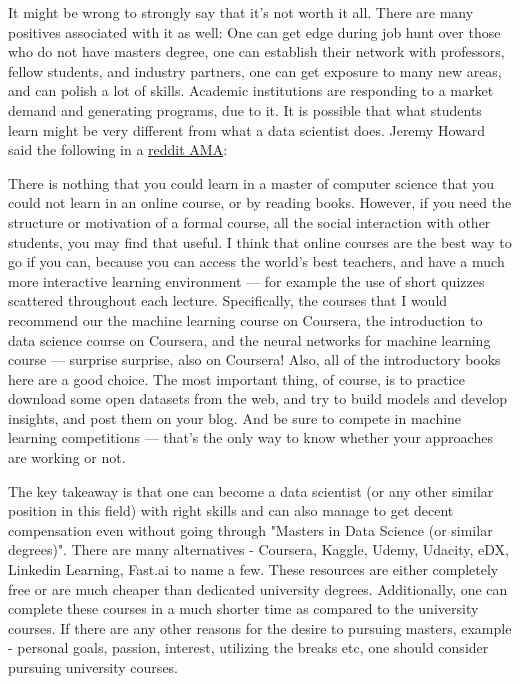 It might be wrong to strongly say that it’s not worth it all. There are many positives associated with it as well: One can get edge during job hunt over those who do not have masters degree, one can establish their network with professors, fellow students, and industry partners, one can get exposure to many new areas, and can polish a lot of skills. Academic institutions are responding to a market demand and generating programs, due to it. It is possible that what students learn might be very different from what a data scientist does.
\newpage
Jeremy Howard said the following in a \href{https://www.reddit.com/r/Futurology/comments/2p6k20/im_jeremy_howard_enlitic_ceo_kaggle_past/cmty7kf/}{reddit AMA}:
\begin{importantbox}
    There is nothing that you could learn in a master of computer science that you could not learn in an online course, or by reading books. However, if you need the structure or motivation of a formal course, all the social interaction with other students, you may find that useful. I think that online courses are the best way to go if you can, because you can access the world's best teachers, and have a much more interactive learning environment — for example the use of short quizzes scattered throughout each lecture. Specifically, the courses that I would recommend our the machine learning course on Coursera, the introduction to data science course on Coursera, and the neural networks for machine learning course — surprise surprise, also on Coursera! Also, all of the introductory books here are a good choice. The most important thing, of course, is to practice download some open datasets from the web, and try to build models and develop insights, and post them on your blog. And be sure to compete in machine learning competitions — that's the only way to know whether your approaches are working or not.
\end{importantbox}
The key takeaway is that one can become a data scientist (or any other similar position in this field) with right skills and can also manage to get decent compensation even without going through "Masters in Data Science (or similar degrees)". There are many alternatives - Coursera, Kaggle, Udemy, Udacity, eDX, Linkedin Learning, Fast.ai to name a few. These resources are either completely free or are much cheaper than dedicated university degrees. Additionally, one can complete these courses in a much shorter time as compared to the university courses. If there are any other reasons for the desire to pursuing masters, example - personal goals, passion, interest, utilizing the breaks etc, one should consider pursuing university courses.

